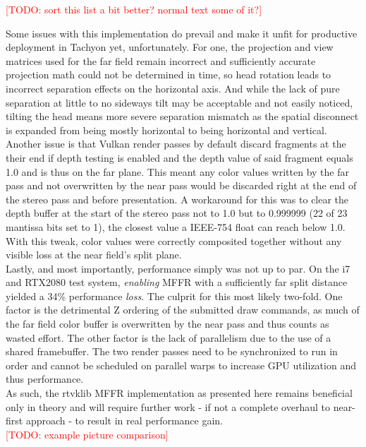 \textcolor{red}{[TODO: sort this list a bit better? normal text some of it?] \\}

Some issues with this implementation do prevail and make it unfit for productive deployment in Tachyon yet, unfortunately. 
For one, the projection and view matrices used for the far field remain incorrect and sufficiently accurate projection math could not be determined in time, so head rotation leads to incorrect separation effects on the horizontal axis. And while the lack of pure separation at little to no sideways tilt may be acceptable and not easily noticed, tilting the head means more severe separation mismatch as the spatial disconnect is expanded from being mostly horizontal to being horizontal and vertical. \\
Another issue is that Vulkan render passes by default discard fragments at the their end if depth testing is enabled and the depth value of said fragment equals 1.0 and is thus on the far plane. This meant any color values written by the far pass and not overwritten by the near pass would be discarded right at the end of the stereo pass and before presentation. A workaround for this was to clear the depth buffer at the start of the stereo pass not to 1.0 but to 0.999999 (22 of 23 mantissa bits set to 1), the closest value a IEEE-754 float can reach below 1.0. With this tweak, color values were correctly composited together without any visible loss at the near field's split plane. \\
Lastly, and most importantly, performance simply was not up to par. On the i7 and RTX2080 test system, \textit{enabling} MFFR with a sufficiently far split distance yielded a 34\% performance \textit{loss}. The culprit for this most likely two-fold. One factor is the detrimental Z ordering of the submitted draw commands, as much of the far field color buffer is overwritten by the near pass and thus counts as wasted effort. The other factor is the lack of parallelism due to the use of a shared framebuffer. The two render passes need to be synchronized to run in order and cannot be scheduled on parallel warps to increase GPU utilization and thus performance. \\
As such, the rtvklib MFFR implementation as presented here remains beneficial only in theory and will require further work - if not a complete overhaul to near-first approach - to result in real performance gain. \\

\textcolor{red}{[TODO: example picture comparison]}



